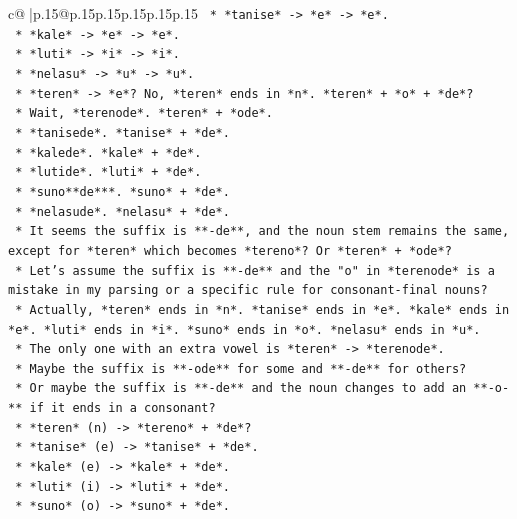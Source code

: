 \documentclass{article}
\begin{document}
{\begin{supertabular}{c@{$\;$}|p{.15\linewidth}@{}p{.15\linewidth}p{.15\linewidth}p{.15\linewidth}p{.15\linewidth}p{.15\linewidth}}
{{{\texttt{                *   *tanise* {-}> *e* {-}> *e*.} \\
\texttt{                *   *kale* {-}> *e* {-}> *e*.} \\
\texttt{                *   *luti* {-}> *i* {-}> *i*.} \\
\texttt{                *   *nelasu* {-}> *u* {-}> *u*.} \\
\texttt{                *   *teren* {-}> *e*? No, *teren* ends in *n*. *teren* + *o* + *de*?} \\
\texttt{            *   Wait, *terenode*. *teren* + *ode*.} \\
\texttt{            *   *tanisede*. *tanise* + *de*.} \\
\texttt{            *   *kalede*. *kale* + *de*.} \\
\texttt{            *   *lutide*. *luti* + *de*.} \\
\texttt{            *   *suno**de***. *suno* + *de*.} \\
\texttt{            *   *nelasude*. *nelasu* + *de*.} \\
\texttt{            *   It seems the suffix is **{-}de**, and the noun stem remains the same, except for *teren* which becomes *tereno*? Or *teren* + *ode*?} \\
\texttt{            *   Let's assume the suffix is **{-}de** and the "o" in *terenode* is a mistake in my parsing or a specific rule for consonant{-}final nouns?} \\
\texttt{            *   Actually, *teren* ends in *n*. *tanise* ends in *e*. *kale* ends in *e*. *luti* ends in *i*. *suno* ends in *o*. *nelasu* ends in *u*.} \\
\texttt{            *   The only one with an extra vowel is *teren* {-}> *terenode*.} \\
\texttt{            *   Maybe the suffix is **{-}ode** for some and **{-}de** for others?} \\
\texttt{            *   Or maybe the suffix is **{-}de** and the noun changes to add an **{-}o{-}** if it ends in a consonant?} \\
\texttt{                *   *teren* (n) {-}> *tereno* + *de*?} \\
\texttt{                *   *tanise* (e) {-}> *tanise* + *de*.} \\
\texttt{                *   *kale* (e) {-}> *kale* + *de*.} \\
\texttt{                *   *luti* (i) {-}> *luti* + *de*.} \\
\texttt{                *   *suno* (o) {-}> *suno* + *de*.} \\
}}}
\end{supertabular}}
\end{document}

